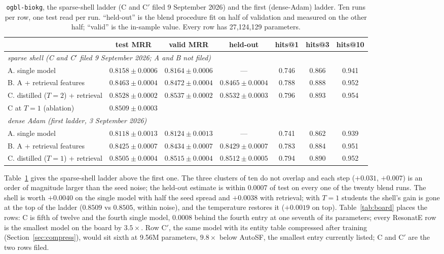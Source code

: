 \documentclass[11pt,a4paper]{article}
\begin{document}
\begin{table}[t]
\centering
\caption{\texttt{ogbl-biokg}, the sparse-shell ladder (C and C$'$ filed 9 September 2026) and the
first (dense-Adam) ladder. Ten runs per row, one test read per run.
``held-out'' is the blend procedure fit on half of validation and
measured on the other half; ``valid'' is the in-sample value. Every row
has 27{,}124{,}129 parameters.}
\label{tab:biokg}
\footnotesize
\setlength{\tabcolsep}{4pt}
\begin{tabular}{lcccccc}
\toprule
 & test MRR & valid MRR & held-out & hits@1 & hits@3 & hits@10 \\
\midrule
\multicolumn{7}{l}{\emph{sparse shell (C and C$'$ filed 9 September 2026; A and B not filed)}} \\
A. single model & $0.8158\pm0.0006$ & $0.8164\pm0.0006$ & --- & 0.746 & 0.866 & 0.941 \\
B. A + retrieval features & $0.8463\pm0.0004$ & $0.8472\pm0.0004$ & $0.8465\pm0.0004$ & 0.788 & 0.888 & 0.952 \\
C. distilled ($T=2$) + retrieval & $\mathbf{0.8528\pm0.0002}$ & $0.8537\pm0.0002$ & $0.8532\pm0.0003$ & 0.796 & 0.893 & 0.954 \\
\quad C at $T=1$ (ablation) & $0.8509\pm0.0003$ & & & & & \\
\midrule
\multicolumn{7}{l}{\emph{dense Adam (first ladder, 3 September 2026)}} \\
A. single model & $0.8118\pm0.0013$ & $0.8124\pm0.0013$ & --- & 0.741 & 0.862 & 0.939 \\
B. A + retrieval features & $0.8425\pm0.0007$ & $0.8434\pm0.0007$ & $0.8429\pm0.0007$ & 0.783 & 0.884 & 0.951 \\
C. distilled ($T=1$) + retrieval & $0.8505\pm0.0004$ & $0.8515\pm0.0004$ & $0.8512\pm0.0005$ & 0.794 & 0.890 & 0.952 \\
\bottomrule
\end{tabular}
\end{table}

Table~\ref{tab:biokg} gives the sparse-shell ladder above the first one. The
three clusters of ten do not overlap and each step ($+0.031$, $+0.007$)
is an order of magnitude larger than the seed noise; the held-out
estimate is within 0.0007 of test on every one of the twenty blend runs.
The shell is worth $+0.0040$ on the single model with half the seed
spread and $+0.0038$ with retrieval; with $T=1$ students the shell's gain
is gone at the top of the ladder ($0.8509$ vs $0.8505$, within noise),
and the temperature restores it ($+0.0019$ on top).
Table~\ref{tab:board} places the rows: C is fifth of twelve and the fourth
single model, 0.0008 behind the fourth entry at one seventh of its
parameters; every ResonatE row is the smallest model on the board by
$3.5\times$. Row C$'$, the same model with its entity table compressed
after training (Section~\ref{sec:compress}), would sit sixth at 9.56M
parameters, $9.8\times$ below AutoSF, the smallest entry currently listed;
C and C$'$ are the two rows filed.
\end{document}
